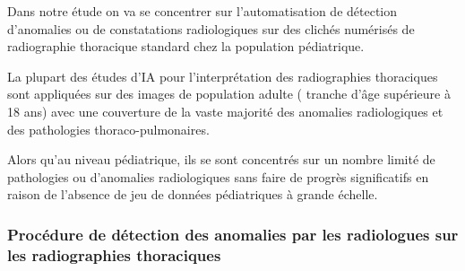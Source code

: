             Dans notre étude on va se concentrer sur l’automatisation de détection d’anomalies ou de constatations radiologiques sur des clichés numérisés de radiographie thoracique standard chez la population pédiatrique.

            La plupart des études d'IA pour l'interprétation des radiographies thoraciques sont appliquées sur des images de population adulte ( tranche d'âge supérieure à 18 ans) avec une couverture de la vaste majorité des anomalies radiologiques et des pathologies thoraco-pulmonaires.

            Alors qu’au niveau pédiatrique, ils se sont concentrés sur un nombre limité de pathologies ou d'anomalies radiologiques sans faire de progrès significatifs en raison de l'absence de  jeu de données  pédiatriques à grande échelle.

            \subsubsection{Procédure de détection des anomalies par les radiologues sur les radiographies thoraciques}
